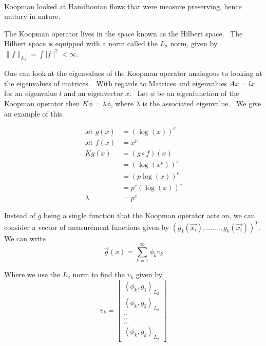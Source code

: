 \documentclass[12pt]{report}
\begin{document}
\ 

Koopman looked at Hamiltonian flows that were measure preserving, hence
unitary in nature. \ 

The Koopman operator lives in the space known as the Hilbert space. \ The
Hilbert space is equipped with a norm called the $L_{2}$ norm, given by $%
\parallel f\parallel _{L_{2}}=\int \mid f\mid ^{2} < \infty $. 

One can look at the eigenvalues of the Koopman operator analogous to looking at
the eigenvalues of matrices. \ With regards to Matrices and eigenvalues $Ax=lx$
for an eigenvalue $l$ and an eigenvector $x$. \ Let $\phi $ be an
eigenfunction of the Koopman operator then $K\phi =\lambda \phi $, where $%
\lambda $ is the associated eigenvalue. \ We give an example of this.

\begin{equation}
    \begin{aligned}
        \text{let }g(x) &=(\log (x))^{c} \\
        \text{let }f(x) &=x^{p} \\
        Kg(x) &=(g\circ f)(x) \\
        &=(\log (x^{p}))^{c} \\
        &=(p\log (x))^{c} \\
        &=p^{c}(\log (x))^{c} \\
        \lambda  &=p^{c}
    \end{aligned}
\end{equation}

Instead of $g$ being a single function that the Koopman operator acts on, we
can consider a vector of measurement functions given by $(g_{1}(%
\vec{x_{i}}),.......,g_{k}(\vec{x_{i}}))^{T}.$ We can write 
\begin{equation}
\vec{g}(x)=\sum\limits_{k=1}^{\infty }\phi _{k}v_{k}
\end{equation}

Where we use the $L_{2}$ norm to find the $v_{k}$ given by%
\begin{equation}
v_{k}=%
\begin{bmatrix}
\left\langle \phi _{k},g_{1}\right\rangle _{L_{2}} \\ 
\left\langle \phi _{k},g_{2}\right\rangle _{L_{2}} \\ 
.. \\ 
.. \\
.. \\ 
\left\langle \phi _{k},g_{k}\right\rangle _{L_{2}}%
\end{bmatrix}%
\end{equation}
\end{document}
